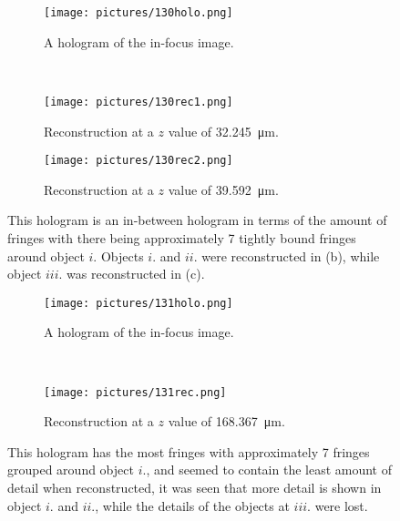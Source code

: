 \begin{figure}[ht!]
    \begin{center}

        \begin{subfigure}[t]{0.4\textwidth}
            \label{fig:130holo}
            \texttt{[image: pictures/130holo.png]}
            \caption{A hologram of the in-focus image.}
        \end{subfigure}
        \\
        \begin{subfigure}[t]{0.4\textwidth}
            \label{fig:130rec1}
            \texttt{[image: pictures/130rec1.png]}
            \caption{Reconstruction at a $z$ value of \SI{32.245}{\micro\meter}.}
        \end{subfigure}
                \hspace*{\fill}
%
        \begin{subfigure}[t]{0.4\textwidth}
            \label{fig:130rec2}
            \texttt{[image: pictures/130rec2.png]}
            \caption{Reconstruction at a $z$ value of \SI{39.592}{\micro\meter}.}
        \end{subfigure}


    \end{center}
    \caption{%
        This hologram is an in-between hologram in terms of the amount of
        fringes with there being approximately 7 tightly bound fringes around
        object $i.$
        Objects $i.$ and $ii.$ were reconstructed in (b),
        while object $iii.$ was reconstructed in (c).
    }%
    \label{fig:130}
\end{figure}


\begin{figure}[ht!]
    \begin{center}

        \begin{subfigure}[t]{0.4\textwidth}
            \label{fig:131holo}
            \texttt{[image: pictures/131holo.png]}
            \caption{A hologram of the in-focus image.}
        \end{subfigure}
        \\
        \begin{subfigure}[t]{0.9\textwidth}
            \label{fig:131rec}
            \texttt{[image: pictures/131rec.png]}
            \caption{Reconstruction at a $z$ value of \SI{168.367}{\micro\meter}.}
        \end{subfigure}

    \end{center}
    \caption{%
        This hologram has the most fringes with approximately 7 fringes
        grouped around object $i.$, and seemed to contain the least
        amount of detail when reconstructed, it was seen that more detail
        is shown in object $i.$ and $ii.$, while the details of the objects at $iii.$
        were lost.
    }%
    \label{fig:131}
\end{figure}

